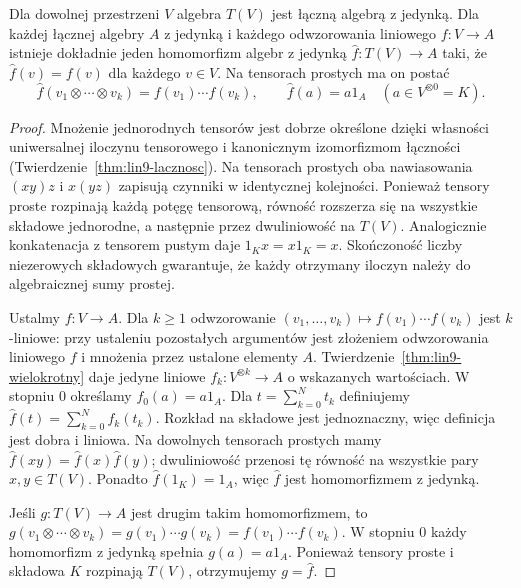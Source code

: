 \begin{twierdzenie}
\label{thm:lin10-tensorowa-uniwersalna}
Dla dowolnej przestrzeni \(V\)
algebra \(T(V)\) jest łączną algebrą z jedynką.
Dla każdej łącznej algebry \(A\) z jedynką
i każdego odwzorowania liniowego
\(f\colon V\to A\)
istnieje dokładnie jeden homomorfizm
algebr z jedynką
\(\widehat f\colon T(V)\to A\) taki, że
\(\widehat f(v)=f(v)\) dla każdego \(v\in V\).
Na tensorach prostych ma on postać
\[
 \widehat f(v_1\otimes\cdots\otimes v_k)
 =f(v_1)\cdots f(v_k),\qquad
 \widehat f(a)=a1_A\quad(a\in V^{\otimes0}=K).
\]
\end{twierdzenie}
\begin{proof}
Mnożenie jednorodnych tensorów jest dobrze
określone dzięki własności uniwersalnej
iloczynu tensorowego i kanonicznym
izomorfizmom łączności
(Twierdzenie~\ref{thm:lin9-lacznosc}).
Na tensorach prostych oba nawiasowania
\((xy)z\) i \(x(yz)\) zapisują czynniki
w identycznej kolejności.
Ponieważ tensory proste rozpinają
każdą potęgę tensorową, równość rozszerza
się na wszystkie składowe jednorodne,
a następnie przez dwuliniowość na \(T(V)\).
Analogicznie konkatenacja z tensorem
pustym daje \(1_Kx=x1_K=x\).
Skończoność liczby niezerowych składowych
gwarantuje, że każdy otrzymany iloczyn
należy do algebraicznej sumy prostej.

Ustalmy \(f\colon V\to A\).
Dla \(k\geq1\) odwzorowanie
\((v_1,\ldots,v_k)\mapsto f(v_1)\cdots f(v_k)\)
jest \(k\)-liniowe: przy ustaleniu
pozostałych argumentów jest złożeniem
odwzorowania liniowego \(f\) i
mnożenia przez ustalone elementy \(A\).
Twierdzenie~\ref{thm:lin9-wielokrotny}
daje jedyne liniowe
\(f_k\colon V^{\otimes k}\to A\)
o wskazanych wartościach.
W stopniu \(0\) określamy
\(f_0(a)=a1_A\).
Dla \(t=\sum_{k=0}^{N}t_k\)
definiujemy
\(\widehat f(t)=\sum_{k=0}^{N}f_k(t_k)\).
Rozkład na składowe jest jednoznaczny,
więc definicja jest dobra i liniowa.
Na dowolnych tensorach prostych mamy
\(\widehat f(xy)=\widehat f(x)\widehat f(y)\);
dwuliniowość przenosi tę równość
na wszystkie pary \(x,y\in T(V)\).
Ponadto \(\widehat f(1_K)=1_A\),
więc \(\widehat f\) jest homomorfizmem
z jedynką.

Jeśli \(g\colon T(V)\to A\) jest drugim
takim homomorfizmem,
to \(g(v_1\otimes\cdots\otimes v_k)
=g(v_1)\cdots g(v_k)
=f(v_1)\cdots f(v_k)\).
W stopniu \(0\) każdy homomorfizm
z jedynką spełnia \(g(a)=a1_A\).
Ponieważ tensory proste i składowa
\(K\) rozpinają \(T(V)\),
otrzymujemy \(g=\widehat f\).
\end{proof}


